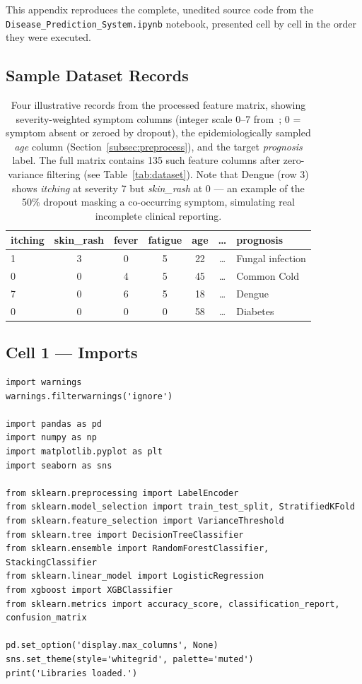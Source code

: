\documentclass[12pt,a4paper]{article}
\begin{document}
This appendix reproduces the complete, unedited source code from the
\texttt{Disease\_Prediction\_System.ipynb} notebook, presented
cell by cell in the order they were executed.

\subsection{Sample Dataset Records}

\begin{table}[H]
\centering
\caption{Four illustrative records from the processed feature matrix, showing severity-weighted
symptom columns (integer scale 0--7 from~\cite{itachi2020}; 0 = symptom absent or zeroed by
dropout), the epidemiologically sampled \textit{age} column (Section~\ref{subsec:preprocess}),
and the target \textit{prognosis} label. The full matrix contains 135 such feature columns
after zero-variance filtering (see Table~\ref{tab:dataset}). Note that Dengue (row 3) shows
\textit{itching} at severity 7 but \textit{skin\_rash} at 0 --- an example of the 50\%
dropout masking a co-occurring symptom, simulating real incomplete clinical reporting.}
\label{tab:sample}
\begin{tabular}{lcccccl}
\toprule
\textbf{itching} & \textbf{skin\_rash} & \textbf{fever} & \textbf{fatigue} & \textbf{age} & \textbf{\ldots} & \textbf{prognosis} \\
\midrule
1 & 3 & 0 & 5 & 22 & \ldots & Fungal infection \\
0 & 0 & 4 & 5 & 45 & \ldots & Common Cold \\
7 & 0 & 6 & 5 & 18 & \ldots & Dengue \\
0 & 0 & 0 & 0 & 58 & \ldots & Diabetes \\
\bottomrule
\end{tabular}
\end{table}

\subsection{Cell 1 --- Imports}

\begin{lstlisting}[caption=Cell 1: Library Imports]
import warnings
warnings.filterwarnings('ignore')

import pandas as pd
import numpy as np
import matplotlib.pyplot as plt
import seaborn as sns

from sklearn.preprocessing import LabelEncoder
from sklearn.model_selection import train_test_split, StratifiedKFold
from sklearn.feature_selection import VarianceThreshold
from sklearn.tree import DecisionTreeClassifier
from sklearn.ensemble import RandomForestClassifier, StackingClassifier
from sklearn.linear_model import LogisticRegression
from xgboost import XGBClassifier
from sklearn.metrics import accuracy_score, classification_report, confusion_matrix

pd.set_option('display.max_columns', None)
sns.set_theme(style='whitegrid', palette='muted')
print('Libraries loaded.')
\end{lstlisting}
\end{document}

